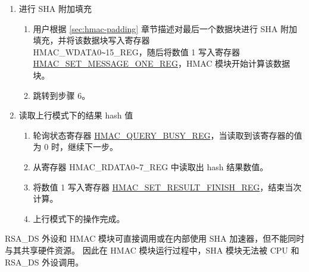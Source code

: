 \documentclass[main\_\_CN.tex]{subfiles}
\begin{document}
\begin{enumerate}
\begin{enumerate}
\begin{itemize}
\begin{enumerate}
                    \item 如果 Block\_\textcolor{red}{n} 是倒数第二个填充数据块，将数值 1 写入寄存器\\ \hyperref[regdesc:HMACSETMESSAGEPADREG]{HMAC\_SET\_MESSAGE\_PAD\_REG}，执行附加填充比特操作，随后跳转到步骤 5。
                    \item 如果 Block\_\textcolor{red}{n} 既不是最后一个也不是倒数第二个数据块，将数值 1 写入寄存器 \\\hyperref[regdesc:HMACSETMESSAGEINGREG]{HMAC\_SET\_MESSAGE\_ING\_REG}，令$n=n+1$，随后跳转到步骤 4.(b)。
                \end{enumerate}
            \end{itemize}
        \end{enumerate}

    \item 进行 SHA 附加填充
    \begin{enumerate}
        \item 用户根据 \ref{sec:hmac-padding} 章节描述对最后一个数据块进行 SHA 附加填充，并将该数据块写入寄存器\\ HMAC\_WDATA0\verb+~+15\_REG，随后将数值 1 写入寄存器 \hyperref[regdesc:HMACSETMESSAGEONEREG]{HMAC\_SET\_MESSAGE\_ONE\_REG}，HMAC 模块开始计算该数据块。
        \item 跳转到步骤 6。
    \end{enumerate}

    \item 读取上行模式下的结果 hash 值
    \begin{enumerate}
        \item 轮询状态寄存器 \hyperref[regdesc:HMACQUERYBUSYREG]{HMAC\_QUERY\_BUSY\_REG}，当读取到该寄存器的值为 0 时，继续下一步。
        \item 从寄存器 HMAC\_RDATA0\verb+~+7\_REG 中读取出 hash 结果数值。
        \item 将数值 1 写入寄存器 \hyperref[regdesc:HMACSETRESULTFINISHREG]{HMAC\_SET\_RESULT\_FINISH\_REG}，结束当次计算。
        \item 上行模式下的操作完成。
    \end{enumerate}

\end{enumerate}

\begin{tiplisting}
\label{hmac_tips_2}
    RSA\_DS 外设和 HMAC 模块可直接调用或在内部使用 SHA 加速器，但不能同时与其共享硬件资源。
    因此在 HMAC 模块运行过程中，SHA 模块无法被 CPU 和 RSA\_DS 外设调用。
\end{tiplisting}
\end{document}
